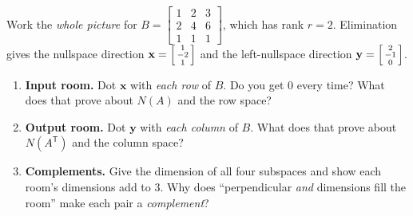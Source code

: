 \documentclass[10pt]{article}
\newcommand{\xx}{\mathbf{x}}
\newcommand{\yy}{\mathbf{y}}
\newcommand{\T}{\mathsf{T}}
\begin{document}
\begin{tcolorbox}[colback=white, colframe=black!40, title=\textbf{Tier A --- Approaching Proficiency},
    fonttitle=\bfseries, arc=1.5mm, left=3mm, right=3mm, top=2mm, bottom=2mm, breakable]
Work the \emph{whole picture} for
$B=\begin{bmatrix} 1 & 2 & 3 \\ 2 & 4 & 6 \\ 1 & 1 & 1 \end{bmatrix}$, which has rank $r=2$. Elimination
gives the nullspace direction $\xx=\begin{bsmallmatrix} 1\\-2\\1 \end{bsmallmatrix}$ and the
left-nullspace direction $\yy=\begin{bsmallmatrix} 2\\-1\\0 \end{bsmallmatrix}$.
\begin{enumerate}[leftmargin=1.7em, itemsep=9pt]
  \item \textbf{Input room.} Dot $\xx$ with \emph{each row} of $B$. Do you get $0$ every time? What does
        that prove about $N(A)$ and the row space? 
  \item \textbf{Output room.} Dot $\yy$ with \emph{each column} of $B$. What does that prove about
        $N(A^{\T})$ and the column space? 
  \item \textbf{Complements.} Give the dimension of all four subspaces and show each room's dimensions
        add to $3$. Why does ``perpendicular \emph{and} dimensions fill the room'' make each pair a
        \emph{complement}? 
\end{enumerate}
\end{tcolorbox}
\end{document}
